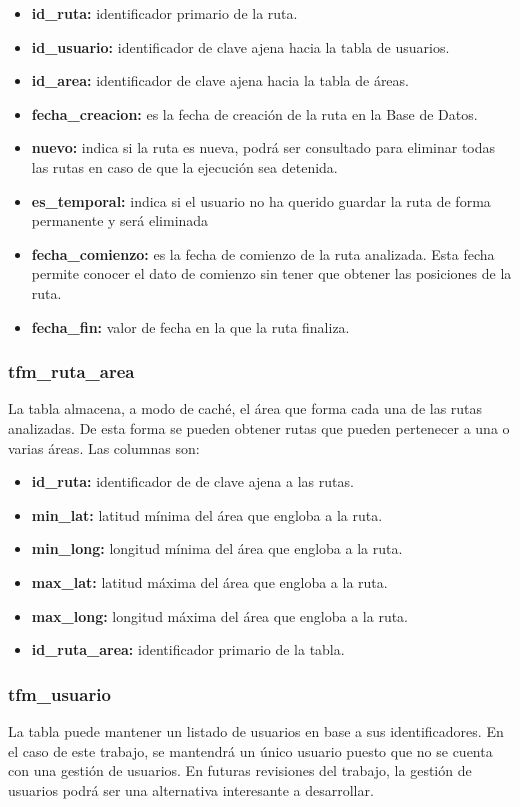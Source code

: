 \begin{itemize}
	\item \textbf{id\_ruta:} identificador primario de la ruta.
	\item \textbf{id\_usuario:} identificador de clave ajena hacia la tabla de usuarios.
	\item \textbf{id\_area:} identificador de clave ajena hacia la tabla de áreas.
	\item \textbf{fecha\_creacion:} es la fecha de creación de la ruta en la Base de Datos.
	\item \textbf{nuevo:} indica si la ruta es nueva, podrá ser consultado para eliminar todas las rutas en caso de que la ejecución sea detenida.
	\item \textbf{es\_temporal:} indica si el usuario no ha querido guardar la ruta de forma permanente  y será eliminada
	\item \textbf{fecha\_comienzo:} es la fecha de comienzo de la ruta analizada. Esta fecha permite conocer el dato  de comienzo sin tener que obtener las posiciones de la ruta.
	\item \textbf{fecha\_fin:} valor de fecha en la que la ruta finaliza.
\end{itemize}

\subsubsection{tfm\_ruta\_area}
La tabla  almacena, a modo de caché, el área que forma cada una de las rutas analizadas. De esta forma se pueden obtener rutas que pueden pertenecer a una o varias áreas. Las columnas son:

\begin{itemize}
	\item \textbf{id\_ruta:} identificador de de clave ajena a las rutas.
	\item \textbf{min\_lat:} latitud mínima del área que engloba a la ruta.
	\item \textbf{min\_long:} longitud mínima del área que engloba a la ruta.
	\item \textbf{max\_lat:} latitud máxima del área que engloba a la ruta.
	\item \textbf{max\_long:} longitud máxima del área que engloba a la ruta.
	\item \textbf{id\_ruta\_area:} identificador primario de la tabla.
\end{itemize}

\subsubsection{tfm\_usuario}
La tabla  puede mantener un listado de usuarios en base a sus identificadores. En el caso de este trabajo, se mantendrá un único usuario puesto que no se cuenta con una gestión de usuarios. En futuras revisiones del trabajo, la gestión de usuarios podrá ser una alternativa interesante a desarrollar.

